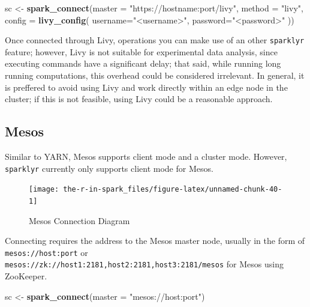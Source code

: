 \documentclass[]{book}
\newenvironment{Shaded}{\begin{snugshade}}{\end{snugshade}}
\newcommand{\DataTypeTok}[1]{\textcolor[rgb]{0.13,0.29,0.53}{#1}}
\newcommand{\KeywordTok}[1]{\textcolor[rgb]{0.13,0.29,0.53}{\textbf{#1}}}
\newcommand{\NormalTok}[1]{#1}
\newcommand{\StringTok}[1]{\textcolor[rgb]{0.31,0.60,0.02}{#1}}
\theoremstyle{definition}
\theoremstyle{definition}
\theoremstyle{definition}
\theoremstyle{remark}
\begin{document}
\begin{Shaded}
\begin{Highlighting}[]
\NormalTok{sc <-}\StringTok{ }\KeywordTok{spark_connect}\NormalTok{(}\DataTypeTok{master =} \StringTok{"https://hostname:port/livy"}\NormalTok{, }\DataTypeTok{method =} \StringTok{"livy"}\NormalTok{, }\DataTypeTok{config =} \KeywordTok{livy_config}\NormalTok{(}
  \DataTypeTok{username=}\StringTok{"<username>"}\NormalTok{,}
  \DataTypeTok{password=}\StringTok{"<password>"}
\NormalTok{))}
\end{Highlighting}
\end{Shaded}

Once connected through Livy, operations you can make use of an other
\texttt{sparklyr} feature; however, Livy is not suitable for
experimental data analysis, since executing commands have a significant
delay; that said, while running long running computations, this overhead
could be considered irrelevant. In general, it is preffered to avoid
using Livy and work directly within an edge node in the cluster; if this
is not feasible, using Livy could be a reasonable approach.

\hypertarget{mesos-1}{%
\subsection{Mesos}\label{mesos-1}}

Similar to YARN, Mesos supports client mode and a cluster mode. However,
\texttt{sparklyr} currently only supports client mode for Mesos.

\begin{figure}

{\centering \texttt{[image: the-r-in-spark\_files/figure-latex/unnamed-chunk-40-1]} 

}

\caption{Mesos Connection Diagram}\label{fig:unnamed-chunk-40}
\end{figure}

Connecting requires the address to the Mesos master node, usually in the
form of \texttt{mesos://host:port} or
\texttt{mesos://zk://host1:2181,host2:2181,host3:2181/mesos} for Mesos
using ZooKeeper.

\begin{Shaded}
\begin{Highlighting}[]
\NormalTok{sc <-}\StringTok{ }\KeywordTok{spark_connect}\NormalTok{(}\DataTypeTok{master =} \StringTok{"mesos://host:port"}\NormalTok{)}
\end{Highlighting}
\end{Shaded}
\end{document}
